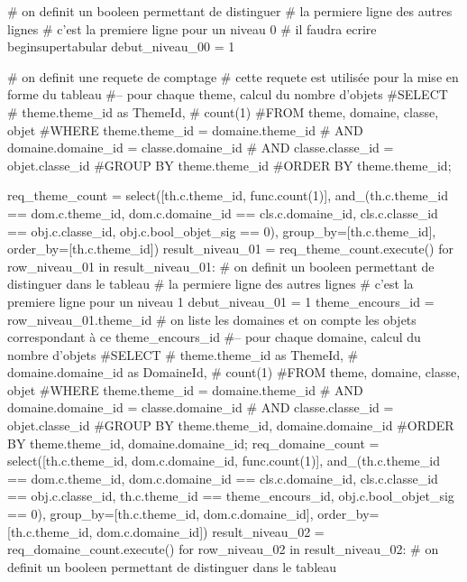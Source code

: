 \documentclass[12pt,titlepage]{book}
\begin{document}
\begin{lbdpython}

# on definit un booleen permettant de distinguer
# la permiere ligne des autres lignes
# c'est la premiere ligne pour un niveau 0
# il faudra ecrire begin{supertabular}
debut_niveau_00 = 1


# on definit une requete de comptage
# cette requete est utilisée pour la mise en forme du tableau
#-- pour chaque theme, calcul du nombre d'objets
#SELECT
#   theme.theme_id as ThemeId,
#   count(1)
#FROM theme, domaine, classe, objet
#WHERE theme.theme_id = domaine.theme_id 
#  AND domaine.domaine_id = classe.domaine_id
#  AND classe.classe_id = objet.classe_id
#GROUP BY theme.theme_id
#ORDER BY theme.theme_id;

req_theme_count = select([th.c.theme_id, func.count(1)],
                  and_(th.c.theme_id == dom.c.theme_id,
                       dom.c.domaine_id == cls.c.domaine_id,
                       cls.c.classe_id == obj.c.classe_id,
                       obj.c.bool_objet_sig == 0),
                  group_by=[th.c.theme_id],
                  order_by=[th.c.theme_id])
result_niveau_01 = req_theme_count.execute()
for row_niveau_01 in result_niveau_01:
   # on definit un booleen permettant de distinguer dans le tableau
   # la permiere ligne des autres lignes
   # c'est la premiere ligne pour un niveau 1
   debut_niveau_01 = 1
   theme_encours_id = row_niveau_01.theme_id
   # on liste les domaines et on compte les objets correspondant à ce theme_encours_id
   #-- pour chaque domaine, calcul du nombre d'objets
   #SELECT
   #   theme.theme_id as ThemeId,
   #   domaine.domaine_id as DomaineId,
   #   count(1)
   #FROM theme, domaine, classe, objet
   #WHERE theme.theme_id = domaine.theme_id
   #  AND domaine.domaine_id = classe.domaine_id
   #  AND classe.classe_id = objet.classe_id
   #GROUP BY theme.theme_id, domaine.domaine_id
   #ORDER BY theme.theme_id, domaine.domaine_id;
   req_domaine_count = select([th.c.theme_id, dom.c.domaine_id, func.count(1)],
                       and_(th.c.theme_id == dom.c.theme_id,
                            dom.c.domaine_id == cls.c.domaine_id,
                            cls.c.classe_id == obj.c.classe_id,
                            th.c.theme_id == theme_encours_id,
                            obj.c.bool_objet_sig == 0),
                       group_by=[th.c.theme_id, dom.c.domaine_id],
                       order_by=[th.c.theme_id, dom.c.domaine_id])
   result_niveau_02 = req_domaine_count.execute()
   for row_niveau_02 in result_niveau_02:
      # on definit un booleen permettant de distinguer dans le tableau

\end{lbdpython}
\end{document}
